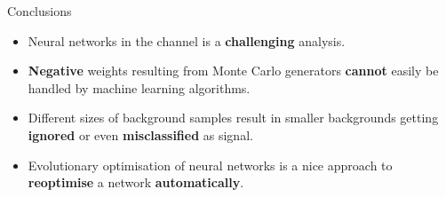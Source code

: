 \begin{frame}{Conclusions}
    \begin{itemize}
        \item Neural networks in the \tHq channel is a \textbf{challenging} analysis.
        \vspace{0.2cm}
        \item \textbf{Negative} weights resulting from Monte Carlo generators \textbf{cannot} easily be handled by machine learning algorithms.
        \vspace{0.2cm}
        \item Different sizes of background samples result in smaller backgrounds getting \textbf{ignored} or even \textbf{misclassified} as signal.
        \vspace{0.2cm}
        \item Evolutionary optimisation of neural networks is a nice approach to \textbf{reoptimise} a network \textbf{automatically}.
    \end{itemize}
\end{frame}